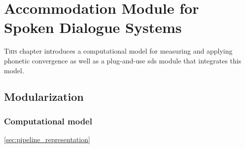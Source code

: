 \chapter[Accommodation Module for Spoken Dialogue Systems]{Accommodation Module for\\Spoken Dialogue Systems}
\label{chap:convergence_module_for_sdss}

\lettrine{T}{his} chapter introduces a computational model for measuring and applying phonetic convergence as well as a plug-and-use \acs{sds} module that integrates this model.

\pagebreak

\section{Modularization}
\label{sec:modularization}


\subsection{Computational model}
\label{subsec:computational_model}

\cref{sec:pipeline_representation}


